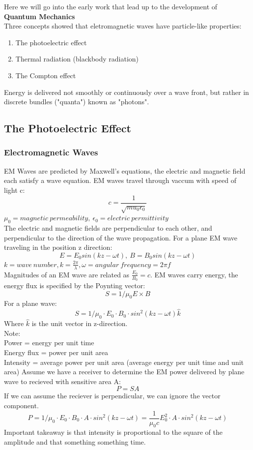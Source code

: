 \documentclass[class=article,crop=false]{standalone}
\begin{document}
\lecture
Here we will go into the early work that lead up to the development of \textbf{Quantum Mechanics} \\
Three concepts showed that eletromagnetic waves have particle-like properties:\\
\begin{enumerate}
	\item The photoelectric effect
	\item Thermal radiation (blackbody radiation)
	\item The Compton effect
\end{enumerate}

Energy is delivered not smoothly or continuously over a wave front, but rather in discrete bundles ("quanta") known as "photons".\\

\subsection{The Photoelectric Effect}
\subsubsection{Electromagnetic Waves}
EM Waves are predicted by Maxwell's equations, the electric and magnetic field each satisfy a wave equation. EM waves travel through vaccum with speed of light c:
$$ c = \frac{1}{\sqrt{mu_0 \epsilon_0}} $$
$\mu_0 = magnetic\ permeability,\ \epsilon_0 = electric\ permittivity$ \\
The electric and magnetic fields are perpendicular to each other, and perpendicular to the direction of the wave propagation. For a plane EM wave traveling in the position z direction: \\
$$ E = E_0 sin(kz - \omega t),\ B = B_0 sin(kz - \omega t) $$
$k = wave\ number, k = \frac{2 \pi}{\lambda}, \omega = angular\ frequency = 2\pi f $ \\
Magnitudes of an EM wave are related as $\frac{E_0}{B_0} = c$. EM waves carry energy, the energy flux is specified by the Poynting vector:
$$ S = 1/\mu_0 E \times B $$
For a plane wave:
$$ S = 1/\mu_0 \cdot E_0 \cdot B_0 \cdot sin^2 (kz - \omega t) \hat{k} $$
Where $\hat{k}$ is the unit vector in z-direction. \\

Note:\\
Power = energy per unit time\\
Energy flux = power per unit area\\
Intensity = average power per unit area (average energy per unit time and unit area)
\newpage
Assume we have a receiver to determine the EM power delivered by plane wave to recieved with sensitive area A: \\
$$ P = SA $$ If we can assume the reciever is perpendicular, we can ignore the vector component.
$$ P = 1/\mu_0 \cdot E_0 \cdot B_0 \cdot A \cdot sin^2(kz - \omega t) = \frac{1}{\mu_0 c} E_0^2 \cdot A \cdot sin^2(kz - \omega t) $$
Important takeaway is that intensity is proportional to the square of the amplitude and that something something time.\\
\end{document}
